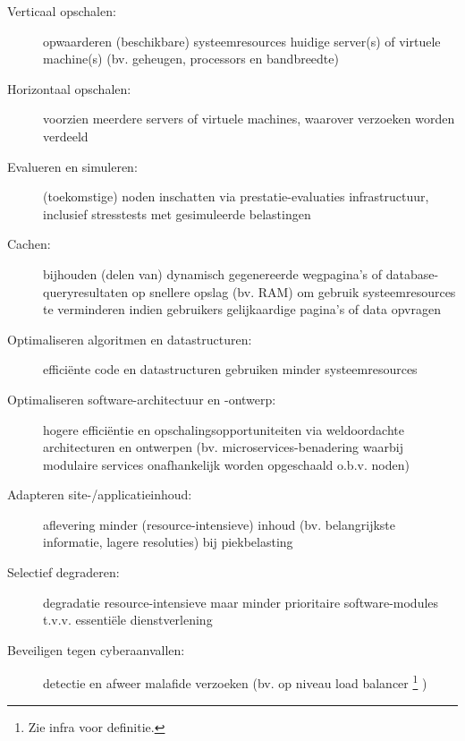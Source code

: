 \begin{description}
    \item [Verticaal opschalen:] opwaarderen (beschikbare)
    systeemresources huidige server(s) of virtuele machine(s)
    (bv. geheugen, processors en bandbreedte)
    \cite{lu2014applicationdriven, michael2007scaleup, appuswamy2013scaleup}

    \item [Horizontaal opschalen:] voorzien meerdere servers of virtuele
    machines, waarover verzoeken worden verdeeld
    \cite{lu2014applicationdriven, michael2007scaleup}

    \item [Evalueren en simuleren:] (toekomstige) noden inschatten
    via prestatie-evaluaties infrastructuur, inclusief
    stresstests met gesimuleerde belastingen
    \cite{penaortiz2015generating, penaortiz2013analyzing, penaortiz2015new}

    \item [Cachen:] bijhouden (delen van) dynamisch gegenereerde wegpagina's
    of database-queryresultaten op snellere opslag (bv. RAM)
    om gebruik systeemresources te verminderen indien gebruikers
    gelijkaardige pagina's of data opvragen
    \cite{sivasubramanian2007analysis,amazon2023whatiscaching}
    
    \item [Optimaliseren algoritmen en datastructuren:] efficiënte code en
    datastructuren gebruiken minder systeemresources
    \cite{feitelson2015introduction}

    \item [Optimaliseren software-architectuur en -ontwerp:] hogere
    efficiëntie \cite{feitelson2015introduction} en
    opschalingsopportuniteiten via weldoordachte
    architecturen en ontwerpen (bv. microservices-benadering waarbij modulaire
    services onafhankelijk worden opgeschaald o.b.v. noden)
    \cite{coulson2020adaptive, thones2015microservices}

    \item [Adapteren site-/applicatieinhoud:]
    aflevering minder (resource-intensieve) inhoud
    (bv. belangrijkste informatie, lagere resoluties)
    bij piekbelasting
    \cite{andersson2006design, abdelzaher1999web, gophstein2011trading}

    \item [Selectief degraderen:]
    degradatie resource-intensieve maar minder prioritaire software-modules
    t.v.v. essentiële dienstverlening
    \cite{wang2012towards}

    \item [Beveiligen tegen cyberaanvallen:] detectie en afweer malafide
    verzoeken \cite{loukas2009protection}
    (bv. op niveau load balancer \footnote{Zie infra voor definitie.}
    \cite{amazon2023whatisload})


\end{description}

